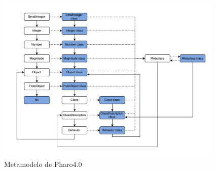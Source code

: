 \documentclass[a4paper, 11pt]{article}
\begin{document}
\begin{figure}[H]
  \begin{center}
  \includegraphics[height=300px]{images/metamodelo_smalltalk.pdf}
  \end{center}
  \caption{Metamodelo de Pharo4.0}
  \label{fig:metamodelo_pharo}
\end{figure}
\end{document}
